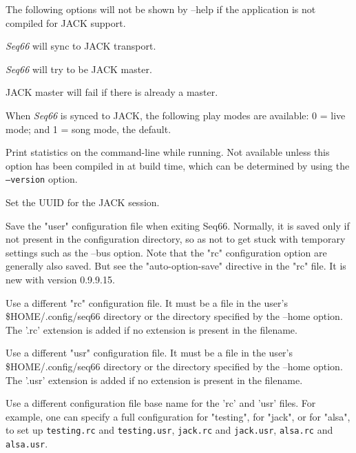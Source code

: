       The following options will not be shown by --help if the application is
      not compiled for JACK support.

      \textsl{Seq66} will sync to JACK transport.

      \textsl{Seq66} will try to be JACK master.

      JACK master will fail if there is already a master.

      When \textsl{Seq66} is synced to JACK, the following play modes
      are available: 0 = live mode; and 1 = song mode, the default.

      Print statistics on the command-line while running.
      Not available unless this option has been compiled in at build time,
      which can be determined by using the \texttt{--version} option.

      Set the UUID for the JACK session.

      Save the "user" configuration file when exiting Seq66.
      Normally, it is saved only if not present in the configuration directory,
      so as not to get stuck with temporary settings such as the --bus option.
      Note that the "rc" configuration option are generally also saved.
      But see the "auto-option-save" directive in the "rc" file.
      It is new with version 0.9.9.15.

      Use a different "rc" configuration file.  It must be a file in the user's
      \$HOME/.config/seq66 directory or the directory specified by the
      --home option.  The '.rc' extension
      is added if no extension is present in the filename.

      Use a different "usr" configuration file.  It must be a file in the
      user's \$HOME/.config/seq66 directory or the directory specified by
      the --home option.  The '.usr'
      extension is added if no extension is present in the filename.

      Use a different configuration file base name for the 'rc' and 'usr'
      files.  For example, one can specify a full configuration for "testing",
      for "jack", or for "alsa", to set up
      \texttt{testing.rc} and \texttt{testing.usr},
      \texttt{jack.rc} and \texttt{jack.usr},
      \texttt{alsa.rc} and \texttt{alsa.usr}.

